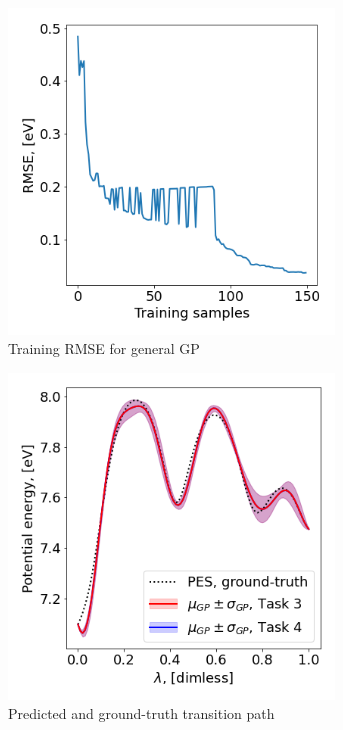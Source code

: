 \documentclass[11pt,a4paper]{article}
\begin{document}
\begin{figure}[ht]
    \centering
    \begin{subfigure}{.46\textwidth}
          \centering
          \includegraphics[width=0.95\textwidth]{figures/task4_train.png}
          \caption{Training RMSE for general GP}
          \label{fig:task4_rmse}
    \end{subfigure}%
    \begin{subfigure}{.46\textwidth}
          \centering
          \includegraphics[width=0.95\textwidth]{figures/task4_path.png}
          \caption{Predicted and ground-truth transition path}
    \label{fig:task4_transition}
    \end{subfigure}
    \caption{}
    \label{fig:task4}
\end{figure}
\end{document}
